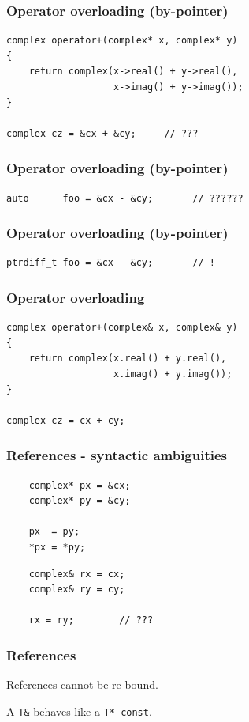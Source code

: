 \documentclass[aspectratio=43]{beamer}
\begin{document}
\begin{frame}[fragile]
  \frametitle{Operator overloading (by-pointer)}
  \begin{lstlisting}
complex operator+(complex* x, complex* y)
{
    return complex(x->real() + y->real(),
                   x->imag() + y->imag());
}

complex cz = &cx + &cy;     // ???
  \end{lstlisting}
\end{frame}


\begin{frame}[fragile]
  \frametitle{Operator overloading (by-pointer)}

  \begin{lstlisting}
auto      foo = &cx - &cy;       // ??????
  \end{lstlisting}
\end{frame}

\begin{frame}[fragile]
  \frametitle{Operator overloading (by-pointer)}

  \begin{lstlisting}
ptrdiff_t foo = &cx - &cy;       // !
  \end{lstlisting}
\end{frame}


\begin{frame}[fragile]
  \frametitle{Operator overloading}
  \pause
  \begin{lstlisting}
complex operator+(complex& x, complex& y)
{
    return complex(x.real() + y.real(),
                   x.imag() + y.imag());
}

complex cz = cx + cy;
  \end{lstlisting}
\end{frame}


\begin{frame}[fragile]
  \frametitle{References - syntactic ambiguities}

  \begin{lstlisting}
    complex* px = &cx;
    complex* py = &cy;

    px  = py;
    *px = *py;
  \end{lstlisting}
  \pause
  \begin{lstlisting}
    complex& rx = cx;
    complex& ry = cy;

    rx = ry;        // ???
  \end{lstlisting}
\end{frame}

\begin{frame}[fragile]
  \frametitle{References}
References cannot be re-bound. \vspace{.1\textheight}

A \texttt{T\&} behaves like a \texttt{T* const}.
\end{frame}
\end{document}
